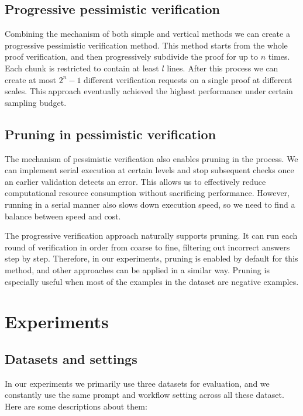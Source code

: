 \documentclass{article} %
\begin{document}
\subsection{Progressive pessimistic verification}

Combining the mechanism of both simple and vertical methods we can create a progressive pessimistic verification method. This method starts from the whole proof verification, and then progressively subdivide the proof for up to $n$ times. Each chunk is restricted to contain at least $l$ lines. After this process we can create at most $2^n - 1$ different verification requests on a single proof at different scales. This approach eventually achieved the highest performance under certain sampling budget.

\subsection{Pruning in pessimistic verification}

The mechanism of pessimistic verification also enables pruning in the process. We can implement serial execution at certain levels and stop subsequent checks once an earlier validation detects an error. This allows us to effectively reduce computational resource consumption without sacrificing performance. However, running in a serial manner also slows down execution speed, so we need to find a balance between speed and cost.

The progressive verification approach naturally supports pruning. It can run each round of verification in order from coarse to fine, filtering out incorrect answers step by step. Therefore, in our experiments, pruning is enabled by default for this method, and other approaches can be applied in a similar way. Pruning is especially useful when most of the examples in the dataset are negative examples.

\section{Experiments}

\subsection{Datasets and settings}

In our experiments we primarily use three datasets for evaluation, and we constantly use the same prompt and workflow setting across all these dataset. Here are some descriptions about them:
\end{document}
